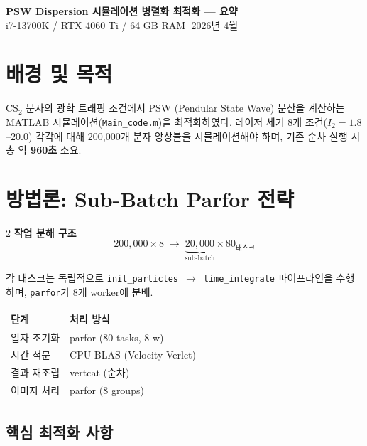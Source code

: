 \documentclass[10pt, a4paper]{article}
\begin{document}
\begin{center}
  {\large\bfseries PSW Dispersion 시뮬레이션 병렬화 최적화 — 요약}\\[2pt]
  {\small i7-13700K / RTX 4060 Ti / 64 GB RAM \quad|\quad 2026년 4월}
\end{center}
\vspace{2pt}

\section{배경 및 목적}

CS$_2$ 분자의 광학 트래핑 조건에서 PSW (Pendular State Wave) 분산을 계산하는
MATLAB 시뮬레이션(\texttt{Main\_code.m})을 최적화하였다.
레이저 세기 8개 조건($I_2 = 1.8$--$20.0$) 각각에 대해 200,000개 분자 앙상블을
시뮬레이션해야 하며, 기존 순차 실행 시 총 약 \textbf{960초} 소요.

\section{방법론: Sub-Batch Parfor 전략}

\begin{multicols}{2}
\textbf{작업 분해 구조}
\[
  200{,}000 \times 8 \;\longrightarrow\; \underbrace{20{,}000}_{\text{sub-batch}} \times 80_{\text{태스크}}
\]

각 태스크는 독립적으로 \texttt{init\_particles}~$\to$~\texttt{time\_integrate}
파이프라인을 수행하며, \texttt{parfor}가 8개 worker에 분배.

\columnbreak

\begin{center}
\small
\begin{tabular}{ll}
\toprule
단계 & 처리 방식 \\
\midrule
입자 초기화 & parfor (80 tasks, 8 w) \\
시간 적분 & CPU BLAS (Velocity Verlet) \\
결과 재조립 & vertcat (순차) \\
이미지 처리 & parfor (8 groups) \\
\bottomrule
\end{tabular}
\end{center}
\end{multicols}

\subsection{핵심 최적화 사항}
\end{document}

